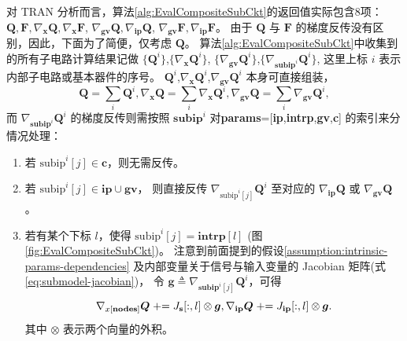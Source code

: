 对 TRAN 分析而言，算法\ref{alg:EvalCompositeSubCkt}的返回值实际包含8项：
$\bm{Q},\bm{F},\nabla_{\bm{x}}\bm{Q},\nabla_{\bm{x}}\bm{F}$,
$\nabla_{\textbf{gv}}\bm{Q},\nabla_{\textbf{ip}}\bm{Q}$,
$\nabla_{\textbf{gv}}\bm{F},\nabla_{\textbf{ip}}\bm{F}$。
由于 $\bm{Q}$ 与 $\bm{F}$ 的梯度反传没有区别，因此，下面为了简便，仅考虑 $\bm{Q}$。
算法\ref{alg:EvalCompositeSubCkt}中收集到的所有子电路计算结果记做
$\{\bm{Q}^{i}\}$,$\{\nabla_{\bm{x}}\bm{Q}^{i}\}$,
$\{\nabla_{\textbf{gv}}\bm{Q}^{i}\}$,$\{\nabla_{\textbf{subip}^i}\bm{Q}^{i}\}$,
这里上标 $i$ 表示内部子电路或基本器件的序号。
$\bm{Q}^{i}$,$\nabla_{\bm{x}}\bm{Q}^{i}$,$\nabla_{\textbf{gv}}\bm{Q}^{i}$
本身可直接组装，
\[
  \bm{Q} = \sum_i \bm{Q}^{i},
  \nabla_{\bm{x}}\bm{Q} = \sum_i \nabla_{\bm{x}}\bm{Q}^{i},
  \nabla_{\textbf{gv}}\bm{Q} = \sum_i \nabla_{\textbf{gv}}\bm{Q}^{i},
\]
而 $\nabla_{\textbf{subip}^i}\bm{Q}^{i}$ 的梯度反传则需按照 $\textbf{subip}^i$
对\textbf{params}=[\textbf{ip},\textbf{intrp},\textbf{gv},\textbf{c}]
的索引来分情况处理：
\begin{enumerate}[partopsep=0pt,itemsep=0pt,parsep=0pt]
  \item 若 $\text{subip}^i[j]\in\textbf{c}$，则无需反传。
  \item 若 $\text{subip}^i[j]\in\textbf{ip}\cup\textbf{gv}$，
    则直接反传 $\nabla_{\text{subip}^i[j]}\bm{Q}^i$
    至对应的 $\nabla_\textbf{ip}\bm{Q}$ 或 $\nabla_\textbf{gv}\bm{Q}$。
  \item 若有某个下标 $l$，使得 $\text{subip}^i[j]=\textbf{intrp}[l]$
    (图\ref{fig:EvalCompositeSubCkt})。
    注意到前面提到的假设\ref{assumption:intrinsic-params-dependencies}
    及内部变量关于信号与输入变量的 Jacobian 矩阵(式\ref{eq:submodel-jacobian})，
    令 $\bm{g}\triangleq\nabla_{\textbf{subip}^i[j]}\bm{Q}^{i}$，可得
    \vspace{-1em}
    \begin{equation}\label{eq:intrinsic-params-backward}
      \nabla_{x[\textbf{nodes}]}\bm{Q}\mathrel{+}=J_{\textbf{s}}[:,l]\otimes\bm{g},
      \nabla_{\textbf{ip}}\bm{Q}\mathrel{+}=J_{\textbf{ip}}[:,l]\otimes\bm{g}.
    \vspace{-1em}
    \end{equation}
    其中 $\otimes$ 表示两个向量的外积。
\end{enumerate}





